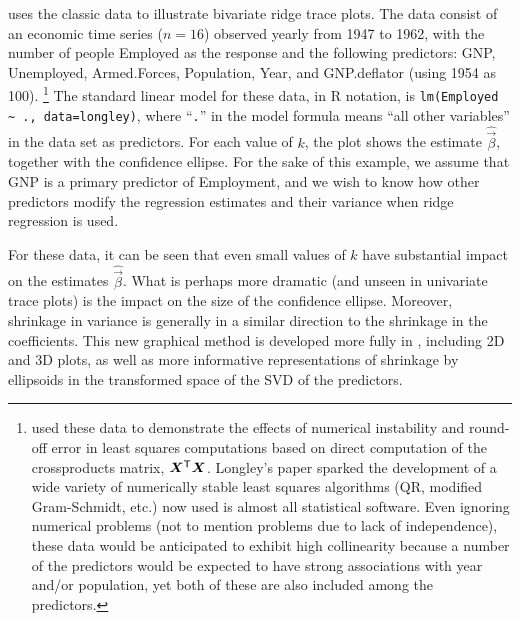  uses the classic \citet{Longley:1967}
data to illustrate
bivariate ridge trace plots.  The data consist of an economic time series ($n=16$)
observed yearly from 1947 to 1962, with the number of people Employed as the
response and the following predictors:
GNP, Unemployed,  Armed.Forces,  Population,  Year, and GNP.deflator (using
1954 as 100).%
\footnote{
\citet{Longley:1967} used these data to demonstrate the effects of
numerical instability and round-off error in least squares computations
based on direct computation of the crossproducts matrix, $\bm{X}^\mathsf{T}\bm{X}$.
Longley's paper sparked the development of a wide variety of
numerically stable least squares algorithms (QR, modified Gram-Schmidt, etc.)
now used is almost all statistical software.
Even ignoring numerical problems
(not to mention problems due to lack of independence), these
data would be anticipated to exhibit high collinearity because
a number of the predictors would be expected to have strong associations
with year and/or population, yet both of these are also included among the
predictors.
}
The standard linear model for these data, in R notation,
is \verb|lm(Employed ~ ., data=longley)|, where ``\texttt{.}''  in the model formula means
``all other variables'' in the data set as predictors.  
For each value of $k$, the plot
shows the estimate $\widehat{\vec{\beta}}$, together with the confidence
ellipse.  For the sake of this example, we assume that GNP is a primary
predictor of Employment, and we wish to know how other predictors modify the
regression estimates and their variance when ridge regression is used.

For these data, it can be seen that even small values of $k$ have substantial
impact on the estimates $\widehat{\vec{\beta}}$. What is perhaps more dramatic
(and unseen in univariate trace plots) is the impact on the size of the confidence
ellipse.  Moreover, shrinkage in variance is generally in a similar direction to the
shrinkage in the coefficients. This new graphical method is developed more fully in \citet{Friendly:genridge:2012},
including 2D and 3D plots, as well as more informative representations of shrinkage by ellipsoids in 
the transformed space of the SVD of the predictors.

